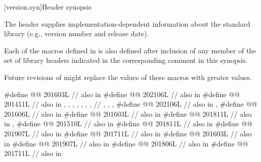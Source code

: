 [version.syn]{Header  synopsis}

\pnum
The header 
supplies implementation-dependent information
about the \Cpp{} standard library
(e.g., version number and release date).

\pnum
Each of the macros defined in  is also defined
after inclusion of any member of the set of library headers
indicated in the corresponding comment in this synopsis.
\begin{note}
Future revisions of \Cpp{} might replace
the values of these macros with greater values.
\end{note}

\begin{codeblock}
#define @@               201603L // also in 
#define @@                 202106L // also in 
#define @@  201411L
  // also in , , , , , , ,
  // , , , 
#define @@ 202106L // also in , 
#define @@                               201606L // also in 
#define @@                             201603L // also in 
#define @@                   201811L // also in , 
#define @@                          201510L // also in 
#define @@                    201811L // also in 
#define @@                  201907L // also in 
#define @@                      201711L // also in 
#define @@        201603L // also in 
#define @@     201907L // also in 
#define @@                        201806L // also in 
#define @@                 201711L // also in 

\end{codeblock}
